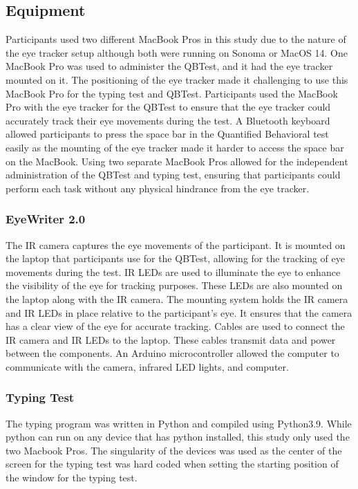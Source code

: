 \documentclass[manuscript, screen, review]{acmart} %
\begin{document}
\subsection[short]{Equipment} 
Participants used two different MacBook Pros in this study due to the nature of the eye tracker setup although both were running on Sonoma or MacOS 14. One MacBook Pro was used to administer the QBTest, and it had the eye tracker mounted on it. The positioning of the eye tracker made it challenging to use this MacBook Pro for the typing test and QBTest. 
Participants used the MacBook Pro with the eye tracker for the QBTest to ensure that the eye tracker could accurately track their eye movements during the test. 
A Bluetooth keyboard allowed participants to press the space bar in the Quantified Behavioral test easily as the mounting of the eye tracker made it harder to access
the space bar on the MacBook.
Using two separate MacBook Pros allowed for the independent administration of the QBTest and typing test, ensuring that participants could perform each task without any physical hindrance from the eye tracker.

\subsubsection{EyeWriter 2.0}
The IR camera captures the eye movements of the participant.
It is mounted on the laptop that participants use for the QBTest, allowing for the tracking of eye movements during the test.
IR LEDs are used to illuminate the eye to enhance the visibility of the eye for tracking purposes. 
These LEDs are also mounted on the laptop along with the IR camera. 
The mounting system holds the IR camera and IR LEDs in place relative to the participant's eye. 
It ensures that the camera has a clear view of the eye for accurate tracking. 
Cables are used to connect the IR camera and IR LEDs to the laptop. These cables transmit data and power between the components.
An Arduino microcontroller allowed the computer to communicate with the camera, infrared LED lights, and computer.

\subsubsection{Typing Test}
The typing program was written in Python and compiled using Python3.9. 
While python can run on any device that has python installed, this study only used the two Macbook Pros. 
The singularity of the devices was used as the center of the screen for the typing test was hard coded when setting the starting position of the window for the typing test. 
\end{document}
